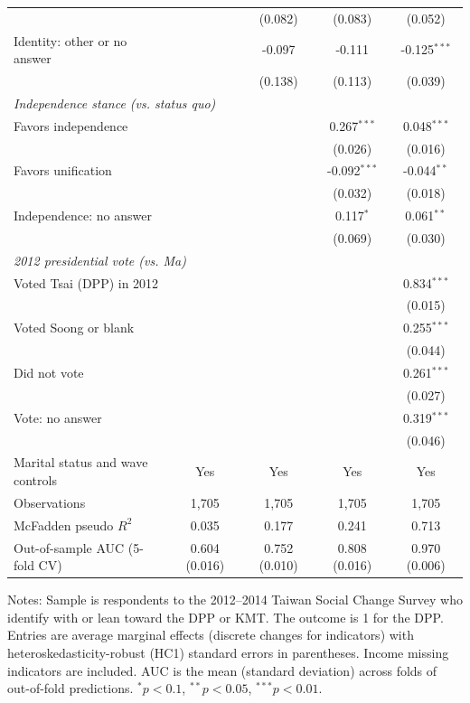 \begin{table}[htbp]
\begin{tabular}{lcccc}
 &  & (0.082) & (0.083) & (0.052) \\
Identity: other or no answer &  & -0.097 & -0.111 & -0.125$^{***}$ \\
 &  & (0.138) & (0.113) & (0.039) \\
\multicolumn{5}{l}{\textit{Independence stance (vs. status quo)}} \\
Favors independence &  &  & 0.267$^{***}$ & 0.048$^{***}$ \\
 &  &  & (0.026) & (0.016) \\
Favors unification &  &  & -0.092$^{***}$ & -0.044$^{**}$ \\
 &  &  & (0.032) & (0.018) \\
Independence: no answer &  &  & 0.117$^{*}$ & 0.061$^{**}$ \\
 &  &  & (0.069) & (0.030) \\
\multicolumn{5}{l}{\textit{2012 presidential vote (vs. Ma)}} \\
Voted Tsai (DPP) in 2012 &  &  &  & 0.834$^{***}$ \\
 &  &  &  & (0.015) \\
Voted Soong or blank &  &  &  & 0.255$^{***}$ \\
 &  &  &  & (0.044) \\
Did not vote &  &  &  & 0.261$^{***}$ \\
 &  &  &  & (0.027) \\
Vote: no answer &  &  &  & 0.319$^{***}$ \\
 &  &  &  & (0.046) \\
\midrule
Marital status and wave controls & Yes & Yes & Yes & Yes \\
Observations & 1,705 & 1,705 & 1,705 & 1,705 \\
McFadden pseudo $R^2$ & 0.035 & 0.177 & 0.241 & 0.713 \\
Out-of-sample AUC (5-fold CV) & 0.604 (0.016) & 0.752 (0.010) & 0.808 (0.016) & 0.970 (0.006) \\
\bottomrule
\end{tabular}
\begin{minipage}{0.95\linewidth}\footnotesize
\vspace{4pt}Notes: Sample is respondents to the 2012--2014 Taiwan Social Change Survey who
identify with or lean toward the DPP or KMT. The outcome is 1 for the DPP. Entries are average
marginal effects (discrete changes for indicators) with heteroskedasticity-robust (HC1) standard
errors in parentheses. Income missing indicators are included. AUC is the mean (standard
deviation) across folds of out-of-fold predictions. $^{*}p<0.1$, $^{**}p<0.05$, $^{***}p<0.01$.
\end{minipage}
\end{table}
